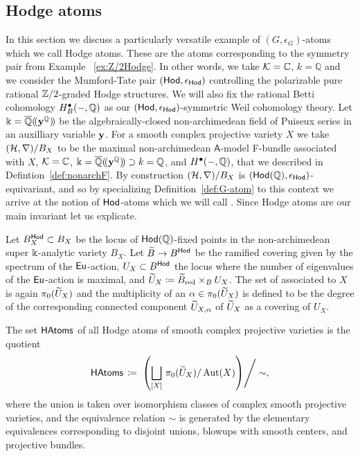 \documentclass[twoside,leqno]{article}
\numberwithin{equation}{section}
\theoremstyle{plain}
\theoremstyle{definition}
\begin{document}
\medskip

\subsection{Hodge atoms} \label{sec:Hodge_atoms}


In this section we discuss a particularly versatile example of $(G,\epsilon_{G})$-atoms which we call Hodge atoms. These are the atoms corresponding to the symmetry pair from Example ~\ref{ex:Z/2Hodge}. In other words, we take $\mathcal K = \mathbb C$, $k = \mathbb{Q}$ and we consider the Mumford-Tate pair $(\mathsf{Hod},\epsilon_{\mathsf{Hod}})$  controlling the polarizable pure rational $\mathbb Z/2$-graded Hodge structures. We will also fix the rational Betti cohomology $H^{\bullet}_{B}(-,\mathbb Q)$ as our $(\mathsf{Hod},\epsilon_{\mathsf{Hod}})$-symmetric Weil cohomology theory. Let $\Bbbk = \overline{\mathbb Q}(\!(\mathbf{y}^{\mathbb Q})\!)$ be the algebraically-closed non-archimedean field of Puiseux series in an auxilliary variable $\mathbf{y}$. For a smooth complex projective variety $X$ we take $(\mathcal H,\nabla)/B_{X}$ to be the maximal non-archimedean $\mathsf{A}$-model F-bundle associated with $X$, $\mathcal K = \mathbb C$, $\Bbbk = \overline{\mathbb Q}(\!(\mathbf{y}^{\mathbb Q})\!) \supset k = \mathbb Q$, and $H^{\bullet}(-,\mathbb Q)$, that we described in Defintion~\ref{def:nonarchF}. By construction 
$(\mathcal H,\nabla)/B_{X}$ is $(\mathsf{Hod}(\mathbb Q),\epsilon_{\mathsf{Hod}})$-equivariant, and so by specializing Definition~\ref{def:G-atom} to this context we arrive at the notion of  $\mathsf{Hod}$-atoms which we will call . Since Hodge atoms are our main invariant let us explicate.

Let $B^{\mathsf{Hod}}_{X} \subset B_{X}$ be the locus of $\mathsf{Hod}(\mathbb Q)$-fixed points in the non-archimedean super $\Bbbk$-analytic variety $B_{X}$.
Let $\widetilde{B} \to B^{\mathsf{Hod}}$ be the ramified covering given by the spectrum of the $\operatorname{\mathsf{Eu}}$-action, $U_X \subset B^{\mathsf{Hod}}$ the locus where the number of eigenvalues of the $\operatorname{\mathsf{Eu}}$-action is maximal, and \linebreak $\widetilde U_X \coloneqq \widetilde{B}_{\operatorname{red}} \times_B U_X$.
The set of  associated to $X$ is again  $\pi_{0}(\widetilde U_{X})$ and the  multiplicity of an $\alpha \in \pi_{0}(\widetilde U_{X})$ is defined to be the degree of the corresponding connected component 
$\widetilde U_{X,\alpha}$ of $\widetilde U_{X}$ as a covering of $U_{X}$. 


The set $\mathsf{HAtoms}$ of all Hodge atoms of smooth complex projective varieties
is the quotient 
\[
\mathsf{HAtoms} \, \coloneqq \, \left.\left( \bigsqcup_{[X]} \, \pi_{0}(\widetilde U_{X})/\operatorname{Aut}(X)\right)\right/\sim, 
\] 
where the union is taken over isomorphism classes of complex smooth projective varieties, and the equivalence relation $\sim$ is generated by the elementary equivalences corresponding to 
disjoint unions, blowups with smooth centers, and projective bundles.
\end{document}
